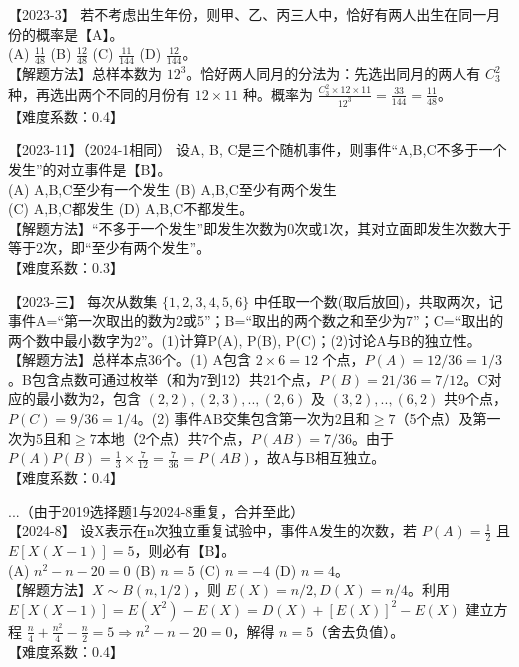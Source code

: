 \documentclass[zihao=4, a4paper, fontset=mac]{ctexart}
\begin{document}
\par\vspace{\baselineskip}

【2023-3】 若不考虑出生年份，则甲、乙、丙三人中，恰好有两人出生在同一月份的概率是【A】。\\
(A) $\frac{11}{48}$ \quad (B) $\frac{12}{48}$ \quad (C) $\frac{11}{144}$ \quad (D) $\frac{12}{144}$。\\
【解题方法】总样本数为 $12^3$。恰好两人同月的分法为：先选出同月的两人有 $C_3^2$ 种，再选出两个不同的月份有 $12\times11$ 种。概率为 $\frac{C_3^2 \times 12 \times 11}{12^3} = \frac{33}{144} = \frac{11}{48}$。\\
【难度系数：0.4】

\par\vspace{\baselineskip}

【2023-11】（2024-1相同） 设A, B, C是三个随机事件，则事件“A,B,C不多于一个发生”的对立事件是【B】。\\
(A) A,B,C至少有一个发生 \quad (B) A,B,C至少有两个发生 \\
(C) A,B,C都发生 \quad (D) A,B,C不都发生。\\
【解题方法】“不多于一个发生”即发生次数为0次或1次，其对立面即发生次数大于等于2次，即“至少有两个发生”。\\
【难度系数：0.3】

\par\vspace{\baselineskip}

【2023-三】 每次从数集 $\{1,2,3,4,5,6\}$ 中任取一个数(取后放回)，共取两次，记事件A=“第一次取出的数为2或5”；B=“取出的两个数之和至少为7”；C=“取出的两个数中最小数字为2”。(1)计算P(A), P(B), P(C)；(2)讨论A与B的独立性。\\
【解题方法】总样本点36个。(1) A包含 $2\times6=12$ 个点，$P(A)=12/36=1/3$。B包含点数可通过枚举（和为7到12）共21个点，$P(B)=21/36=7/12$。C对应的最小数为2，包含 $(2,2),(2,3),..,(2,6)$ 及 $(3,2),..,(6,2)$ 共9个点，$P(C)=9/36=1/4$。(2) 事件AB交集包含第一次为2且和$\ge7$（5个点）及第一次为5且和$\ge7$本地（2个点）共7个点，$P(AB)=7/36$。由于 $P(A)P(B)=\frac{1}{3}\times\frac{7}{12}=\frac{7}{36}=P(AB)$，故A与B相互独立。\\
【难度系数：0.4】

\par\vspace{\baselineskip}

...（由于2019选择题1与2024-8重复，合并至此）\\
【2024-8】 设X表示在n次独立重复试验中，事件A发生的次数，若 $P(A)=\frac{1}{2}$ 且 $E[X(X-1)]=5$，则必有【B】。\\
(A) $n^2-n-20=0$ \quad (B) $n=5$ \quad (C) $n=-4$ \quad (D) $n=4$。\\
【解题方法】$X\sim B(n, 1/2)$，则 $E(X)=n/2, D(X)=n/4$。利用 $E[X(X-1)] = E(X^2)-E(X) = D(X)+[E(X)]^2-E(X)$ 建立方程 $\frac{n}{4} + \frac{n^2}{4} - \frac{n}{2} = 5 \Rightarrow n^2-n-20=0$，解得 $n=5$（舍去负值）。\\
【难度系数：0.4】
\end{document}
